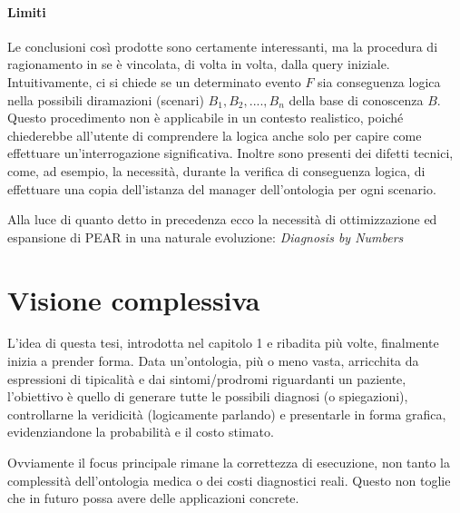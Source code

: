 \paragraph{Limiti}
Le conclusioni così prodotte sono certamente interessanti, ma la procedura di ragionamento in se è vincolata, di volta
in volta, dalla query iniziale. \\Intuitivamente, ci si chiede se un determinato evento $ F $ sia 
conseguenza logica nella possibili diramazioni (scenari) $ B_1,B_2,....,B_n $ della base di conoscenza $ B $.
Questo procedimento non è applicabile in un contesto realistico, poiché chiederebbe all'utente di comprendere
la logica anche solo per capire come effettuare un'interrogazione significativa.
Inoltre sono presenti dei difetti tecnici, come, ad esempio, la necessità, durante la verifica di
conseguenza logica, di effettuare una copia dell'istanza del manager dell'ontologia per ogni scenario.

Alla luce di quanto detto in precedenza ecco la necessità di ottimizzazione ed espansione di PEAR in 
una naturale evoluzione: \textsl{Diagnosis by Numbers}

\section{Visione complessiva}
L'idea di questa tesi, introdotta nel capitolo 1 e ribadita più volte, finalmente inizia a prender forma.
Data un'ontologia, più o meno vasta, arricchita da espressioni di tipicalità e dai sintomi/prodromi
riguardanti un paziente, l'obiettivo è quello di generare tutte le possibili diagnosi (o spiegazioni),
controllarne la veridicità (logicamente parlando) e presentarle in forma grafica, evidenziandone la 
probabilità e il costo stimato.

Ovviamente il focus principale rimane la correttezza di esecuzione, non tanto la complessità dell'ontologia
medica o dei costi diagnostici reali. Questo non toglie che in futuro possa avere delle applicazioni concrete.

